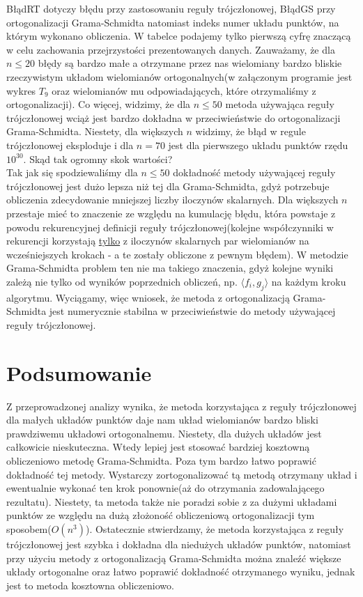 \documentclass[12pt,wide]{mwart}
\begin{document}
BłądRT dotyczy błędu przy zastosowaniu reguły trójczłonowej, BłądGS przy ortogonalizacji Grama-Schmidta natomiast indeks numer układu punktów, na którym wykonano obliczenia. W tabelce podajemy tylko pierwszą cyfrę znaczącą w celu zachowania przejrzystości prezentowanych danych. Zauważamy, że dla $n\leq 20$ błędy są bardzo małe a otrzymane przez nas wielomiany bardzo bliskie rzeczywistym układom wielomianów ortogonalnych(w załączonym programie jest wykres $T_9$ oraz wielomianów mu odpowiadających, które otrzymaliśmy z ortogonalizacji). Co więcej, widzimy, że dla $n \leq 50$ metoda używająca reguły trójczłonowej wciąż jest bardzo dokładna w przeciwieństwie do ortogonalizacji Grama-Schmidta. Niestety, dla większych $n$ widzimy, że błąd w regule trójczłonowej eksploduje i dla $ n = 70$ jest dla pierwszego układu punktów rzędu $10^{30}$. Skąd tak ogromny skok wartości?\\

Tak jak się spodziewaliśmy dla $n \leq 50$ dokładność metody używającej reguły trójczłonowej jest dużo lepsza niż tej dla Grama-Schmidta, gdyż potrzebuje obliczenia zdecydowanie mniejszej liczby iloczynów skalarnych. Dla większych $n$ przestaje mieć to znaczenie ze względu na kumulację błędu, która powstaje z powodu rekurencyjnej definicji reguły trójczłonowej(kolejne współczynniki w rekurencji korzystają \underline{tylko} z iloczynów skalarnych par wielomianów na wcześniejszych krokach - a te zostały obliczone z pewnym błędem). W metodzie Grama-Schmidta problem ten nie ma takiego znaczenia, gdyż kolejne wyniki zależą nie tylko od wyników poprzednich obliczeń, np. $\langle f_i,g_j\rangle$ na każdym kroku algorytmu. Wyciągamy, więc wniosek, że metoda z ortogonalizacją Grama-Schmidta jest numerycznie stabilna w przeciwieństwie do metody używającej reguły trójczłonowej.
 
	
\section{Podsumowanie}

Z przeprowadzonej analizy wynika, że metoda korzystająca z reguły trójczłonowej dla małych układów punktów daje nam układ wielomianów bardzo bliski prawdziwemu układowi ortogonalnemu. Niestety, dla dużych układów jest całkowicie nieskuteczna. Wtedy lepiej jest stosować bardziej kosztowną obliczeniowo metodę Grama-Schmidta. Poza tym bardzo łatwo poprawić dokładność tej metody. Wystarczy zortogonalizować tą metodą otrzymany układ i ewentualnie wykonać ten krok ponownie(aż do otrzymania zadowalającego rezultatu). Niestety, ta metoda także nie poradzi sobie z za dużymi układami punktów ze względu na dużą złożoność obliczeniową ortogonalizacji tym sposobem($O(n^3)$). Ostatecznie stwierdzamy, że metoda korzystająca z reguły trójczłonowej jest szybka i dokładna dla niedużych układów punktów, natomiast przy użyciu metody z ortogonalizacją Grama-Schmidta można znaleźć większe układy ortogonalne oraz łatwo poprawić dokładność otrzymanego wyniku, jednak jest to metoda kosztowna obliczeniowo. 
\end{document}
